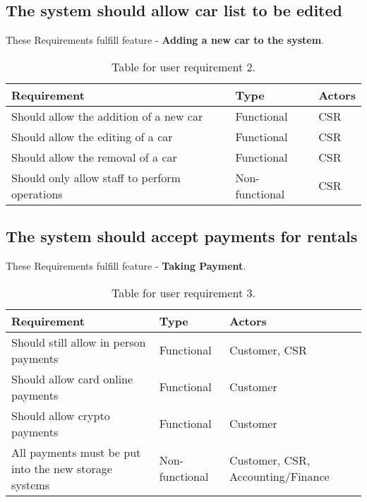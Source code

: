   \subsection{The system should allow car list to be edited}
  These Requirements fulfill feature - \textbf{Adding a new car to the system}.
    \begin{table}[H]
      \centering
      \begin{tabular}{|p{}|p{}|p{}|}
        \hline
        Requirement & Type & Actors \\ \hline
        Should allow the addition of a new car & Functional & CSR \\ \hline
        Should allow the editing of a car & Functional & CSR \\ \hline
        Should allow the removal of a car & Functional & CSR \\ \hline
        Should only allow staff to perform operations  & Non-functional & CSR \\ \hline
      \end{tabular}
      \caption{Table for user requirement 2.}
    \end{table}

  \subsection{The system should accept payments for rentals}
  These Requirements fulfill feature - \textbf{Taking Payment}.
    \begin{table}[H]
      \centering
      \begin{tabular}{|p{}|p{}|p{}|}
        \hline
        Requirement & Type & Actors \\ \hline
        Should still allow in person payments & Functional & Customer, CSR \\ \hline
        Should allow card online payments & Functional & Customer \\ \hline
        Should allow crypto payments & Functional & Customer \\ \hline
        All payments must be put into the new storage systems & Non-functional & Customer, CSR, Accounting/Finance \\ \hline
      \end{tabular}
      \caption{Table for user requirement 3.}
    \end{table}

